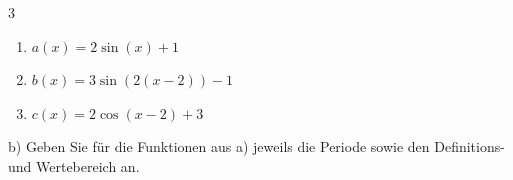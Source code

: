 \documentclass[11pt, a4paper, oneside]{article}
\begin{document}
	\begin{multicols}{3}
		\begin{enumerate}[label=(\roman*)]
			\item $a(x) = 2\sin(x)+1$
			\item $b(x) = 3\sin(2(x-2))-1$
			\item $c(x) = 2\cos(x-2)+3$
		\end{enumerate}
	\end{multicols}
	
	\checkered[5.5cm]
	
	b) Geben Sie für die Funktionen aus a) jeweils die Periode sowie den Definitions- und Wertebereich an.
	
	\checkered[3.5cm]
	
	\let\clearpage\relax
\end{document}
